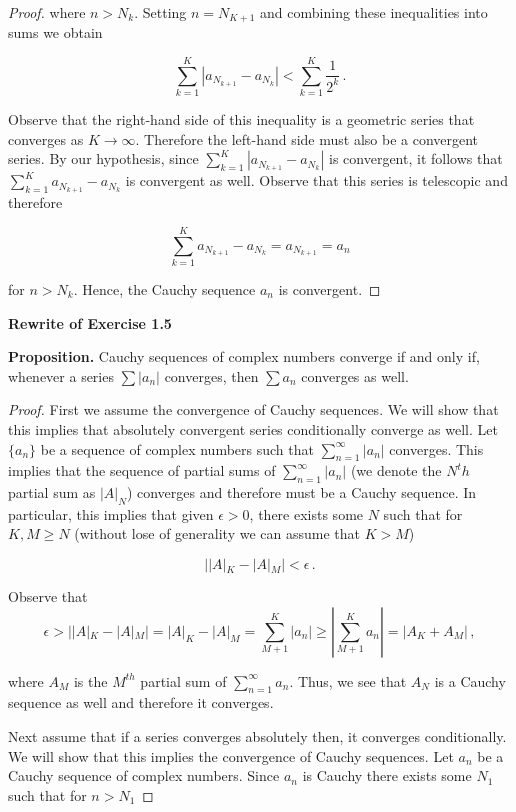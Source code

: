 \documentclass[a4paper]{article}
\numberwithin{equation}{section}
\begin{document}
\begin{description}
\begin{proof}
	where $n > N_k$. Setting $n = N_{K+1}$ and  combining these inequalities into sums we obtain
	
	$$\sum_{k=1}^K |a_{N_{k+1}} - a_{N_{k}}| < \sum_{k=1}^K \frac{1}{2^k}\,.$$
	
	Observe that the right-hand side of this inequality is a geometric series that converges as $K \rightarrow \infty$. Therefore the left-hand side must also be a convergent series. By our hypothesis, since $\sum_{k=1}^K |a_{N_{k+1}} - a_{N_{k}}|$ is convergent, it follows that $\sum_{k=1}^K a_{N_{k+1}} - a_{N_{k}}$ is convergent as well.  Observe that this series is telescopic and therefore
	
	$$\sum_{k=1}^K a_{N_{k+1}} - a_{N_{k}} = a_{N_{k+1}} = a_n$$
	
	for $n > N_{k}$. Hence, the Cauchy sequence ${a_n}$ is convergent.

\end{proof}

\item \textbf{Rewrite of Exercise 1.5} 

\textbf{Proposition.} Cauchy sequences of complex numbers converge if and only if, whenever a series $\sum |a_n|$ converges, then $\sum a_n$ converges as well.

\begin{proof} First we assume the convergence of Cauchy sequences. We will show that this implies that absolutely convergent series conditionally converge as well. Let $\lbrace a_n \rbrace$ be a sequence of complex numbers such that $\sum_{n=1}^\infty |a_n|$ converges. This implies that the sequence of partial sums of $\sum_{n=1}^\infty |a_n|$ (we denote the $N^th$ partial sum as $|A|_N$) converges and therefore must be a Cauchy sequence. In particular, this implies that given $\epsilon > 0$, there exists some $N$ such that for $K,M \geq N$ (without lose of generality we can assume that $K > M$) 

	$$||A|_K - |A|_M| < \epsilon\,.$$
	
	Observe that 
	$$\epsilon > ||A|_K - |A|_M| = |A|_K - |A|_M = \sum_{M+1}^K |a_n| \geq |\sum_{M+1}^K a_n| = |A_K +A_M|\,,$$
	
	where $A_M$ is the $M^{th}$ partial sum of $\sum_{n=1}^\infty a_n$. Thus, we see that ${A_N}$ is a Cauchy sequence as well and therefore it converges. 

Next assume that if a series converges absolutely then, it converges conditionally. We will show that this implies the convergence of Cauchy sequences. Let ${a_n}$ be a Cauchy sequence of complex numbers. Since ${a_n}$ is Cauchy there exists some $N_1$ such that for $n > N_1$


\end{proof}
\end{description}
\end{document}
